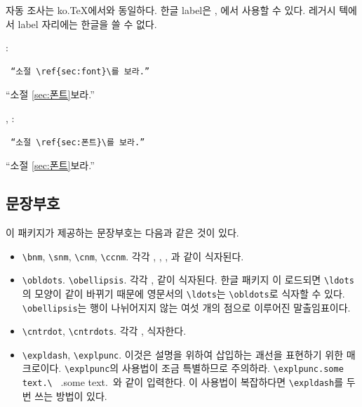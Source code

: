 \documentclass[
	12pt,
	a4paper,
	kosection,
	footnote,
	nobookmarks,
	microtype,
	figtabcapt,
]{oblivoir}
\def\myREF#1#2{\ref{#1}}
\def\myREF#1#2{\ref{#2}}
\begin{document}
자동 조사는 ko.\TeX 에서와 동일하다.
한글 label은 \XeTeX, \LuaTeX 에서 사용할 수 있다.
레거시 텍에서 label 자리에는 한글을 쓸 수 없다. 

\medskip

\noindent{}:\\
\noindent\begin{minipage}{.45\textwidth}
\begin{verbatim}
 “소절 \ref{sec:font}\를 보라.”
\end{verbatim}
\end{minipage}\hfill
\begin{minipage}{.45\textwidth}
\hfill “소절 \myREF{sec:font}{sec:폰트}\를 보라.”
\end{minipage}

\noindent{}, :\\
\noindent\begin{minipage}{.45\textwidth}
\begin{verbatim}
 “소절 \ref{sec:폰트}\를 보라.”
\end{verbatim}
\end{minipage}\hfill
\begin{minipage}{.45\textwidth}
\hfill “소절 \myREF{sec:font}{sec:폰트}\를 보라.”
\end{minipage}


\subsection{문장부호}

이 패키지가 제공하는 문장부호는 다음과 같은 것이 있다.

\begin{itemize}
\item \verb|\bnm|, \verb|\snm|, \verb|\cnm|, \verb|\ccnm|. 각각 , , , 과 같이 식자된다.
\item \verb|\obldots|. \verb|\obellipsis|. 각각 \obldots,  같이 식자된다. 한글 패키지 \koTeX 이 로드되면 \verb|\ldots|의 모양이  같이 바뀌기 때문에 영문서의 \verb|\ldots|는 \verb|\obldots|로 식자할 \obldots 수 있다. \verb|\obellipsis|는 행이 나뉘어지지 않는 여섯 개의 점으로 이루어진 말출임표이다.
\item \verb|\cntrdot|, \verb|\cntrdots|. 각각 \cntrdot,  식자한다.
\item \verb|\expldash|, \verb|\explpunc|. 이것은 설명을 위하여 삽입하는 괘선\expldash 을 표현하기 위한 매크로이다. \verb|\explpunc|의 사용법이 조금 특별하므로 주의하라. \verb*|\explpunc.some text.\ | \explpunc.some text.\ 와 같이 입력한다. 이 사용법이 복잡하다면 \verb|\expldash|를 두 번 쓰는 방법이 있다.
\end{itemize}
\end{document}
